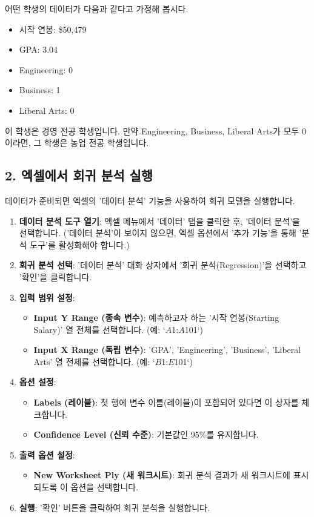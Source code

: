 \documentclass[11pt,a4paper]{article}
\begin{document}
\begin{tcolorbox}[example={더미 변수 코딩 예시}]
어떤 학생의 데이터가 다음과 같다고 가정해 봅시다.
\begin{itemize}
    \item 시작 연봉: \$50,479
    \item GPA: 3.04
    \item Engineering: 0
    \item Business: 1
    \item Liberal Arts: 0
\end{itemize}
이 학생은 경영 전공 학생입니다. 만약 Engineering, Business, Liberal Arts가 모두 0이라면, 그 학생은 농업 전공 학생입니다.
\end{tcolorbox}

\subsection*{2. 엑셀에서 회귀 분석 실행}

데이터가 준비되면 엑셀의 '데이터 분석' 기능을 사용하여 회귀 모델을 실행합니다.

\begin{enumerate}
    \item \textbf{데이터 분석 도구 열기}: 엑셀 메뉴에서 '데이터' 탭을 클릭한 후, '데이터 분석'을 선택합니다. ('데이터 분석'이 보이지 않으면, 엑셀 옵션에서 '추가 기능'을 통해 '분석 도구'를 활성화해야 합니다.)
    \item \textbf{회귀 분석 선택}: '데이터 분석' 대화 상자에서 '회귀 분석(Regression)'을 선택하고 '확인'을 클릭합니다.
    \item \textbf{입력 범위 설정}:
    \begin{itemize}
        \item \textbf{Input Y Range (종속 변수)}: 예측하고자 하는 '시작 연봉(Starting Salary)' 열 전체를 선택합니다. (예: `$A$1:$A$101`)
        \item \textbf{Input X Range (독립 변수)}: 'GPA', 'Engineering', 'Business', 'Liberal Arts' 열 전체를 선택합니다. (예: `$B$1:$E$101`)
    \end{itemize}
    \item \textbf{옵션 설정}:
    \begin{itemize}
        \item \textbf{Labels (레이블)}: 첫 행에 변수 이름(레이블)이 포함되어 있다면 이 상자를 체크합니다.
        \item \textbf{Confidence Level (신뢰 수준)}: 기본값인 95\%를 유지합니다.
    \end{itemize}
    \item \textbf{출력 옵션 설정}:
    \begin{itemize}
        \item \textbf{New Worksheet Ply (새 워크시트)}: 회귀 분석 결과가 새 워크시트에 표시되도록 이 옵션을 선택합니다.
    \end{itemize}
    \item \textbf{실행}: '확인' 버튼을 클릭하여 회귀 분석을 실행합니다.
\end{enumerate}
\end{document}

